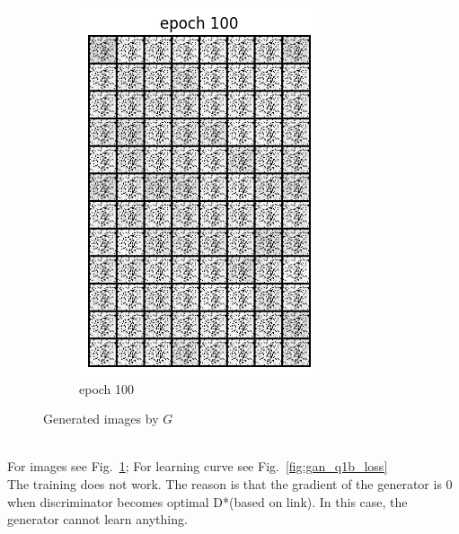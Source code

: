 \documentclass[a4paper]{article}
\theoremstyle{definition}
\newenvironment{soln}{
	\leavevmode\color{blue}\ignorespaces
}{}
\begin{document}
\begin{enumerate} [label=(\alph*)]
\begin{figure}[H]
\begin{subfigure}[b]{0.3\textwidth}
				\includegraphics[width=\textwidth]{gan_q1b_epoch100.png}
				\caption{epoch 100}
			\end{subfigure}
			\caption{Generated images by $G$}
			\label{fig:threegraphs_q1b}
		\end{figure}
		
		
		\begin{soln} \\
		For images see Fig.~\ref{fig:threegraphs_q1b}; For learning curve see Fig.~\ref{fig:gan_q1b_loss} \\
		The training does not work. The reason is that the gradient of the generator is 0 when discriminator becomes optimal D*(based on link). In this case, the generator cannot learn anything. 
		\end{soln}


\end{enumerate}
\end{document}
